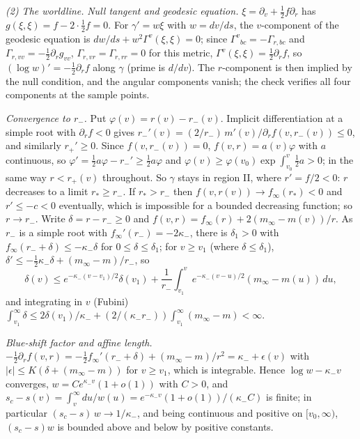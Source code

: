 \emph{(2) The worldline.} \emph{Null tangent and geodesic equation.} $\xi = \partial_{v} + \frac12 f\partial_{r}$ has $g(\xi, \xi) = f - 2\cdot\frac12 f = 0$. For $\gamma' = w\xi$ with $w = dv/ds$, the $v$-component of the geodesic equation is $dw/ds + w^{2}\Gamma^{v}(\xi, \xi) = 0$; since $\Gamma^{v}{}_{bc} = -\Gamma_{r,bc}$ and $\Gamma_{r,vv} = -\frac12\partial_{r}g_{vv}$, $\Gamma_{r,vr} = \Gamma_{r,rr} = 0$ for this metric, $\Gamma^{v}(\xi,\xi) = \frac12\partial_{r}f$, so $(\log w)' = -\frac12\partial_{r}f$ along $\gamma$ (prime is $d/dv$). The $r$-component is then implied by the null condition, and the angular components vanish; the check verifies all four components at the sample points.

\emph{Convergence to $r_{-}$.} Put $\varphi(v) = r(v) - r_{-}(v)$. Implicit differentiation at a simple root with $\partial_{r}f < 0$ gives $r_{-}'(v) = (2/r_{-})\,m'(v)/\partial_{r}f(v, r_{-}(v)) \le 0$, and similarly $r_{+}' \ge 0$. Since $f(v, r_{-}(v)) = 0$, $f(v, r) = a(v)\varphi$ with $a$ continuous, so $\varphi' = \frac12 a\varphi - r_{-}' \ge \frac12 a\varphi$ and $\varphi(v) \ge \varphi(v_{0})\exp\int_{v_{0}}^{v}\frac12 a > 0$; in the same way $r < r_{+}(v)$ throughout. So $\gamma$ stays in region II, where $r' = f/2 < 0$: $r$ decreases to a limit $r_{*} \ge r_{-}$. If $r_{*} > r_{-}$ then $f(v, r(v)) \to f_{\infty}(r_{*}) < 0$ and $r' \le -c < 0$ eventually, which is impossible for a bounded decreasing function; so $r \to r_{-}$. Write $\delta = r - r_{-} \ge 0$ and $f(v, r) = f_{\infty}(r) + 2(m_{\infty} - m(v))/r$. As $r_{-}$ is a simple root with $f_{\infty}'(r_{-}) = -2\kappa_{-}$, there is $\delta_{1} > 0$ with $f_{\infty}(r_{-} + \delta) \le -\kappa_{-}\delta$ for $0 \le \delta \le \delta_{1}$; for $v \ge v_{1}$ (where $\delta \le \delta_{1}$), $\delta' \le -\frac12\kappa_{-}\delta + (m_{\infty} - m)/r_{-}$, so
\[
\delta(v) \le e^{-\kappa_{-}(v - v_{1})/2}\delta(v_{1}) + \frac{1}{r_{-}}\int_{v_{1}}^{v}e^{-\kappa_{-}(v - u)/2}(m_{\infty} - m(u))\,du ,
\]
and integrating in $v$ (Fubini) $\int_{v_{1}}^{\infty}\delta \le 2\delta(v_{1})/\kappa_{-} + (2/(\kappa_{-}r_{-}))\int_{v_{1}}^{\infty}(m_{\infty} - m) < \infty$.

\emph{Blue-shift factor and affine length.} $-\frac12\partial_{r}f(v, r) = -\frac12 f_{\infty}'(r_{-} + \delta) + (m_{\infty} - m)/r^{2} = \kappa_{-} + \epsilon(v)$ with $|\epsilon| \le K(\delta + (m_{\infty} - m))$ for $v \ge v_{1}$, which is integrable. Hence $\log w - \kappa_{-}v$ converges, $w = Ce^{\kappa_{-}v}(1 + o(1))$ with $C > 0$, and $s_{c} - s(v) = \int_{v}^{\infty}du/w(u) = e^{-\kappa_{-}v}(1 + o(1))/(\kappa_{-}C)$ is finite; in particular $(s_{c} - s)\,w \to 1/\kappa_{-}$, and being continuous and positive on $[v_{0}, \infty)$, $(s_{c} - s)w$ is bounded above and below by positive constants.

